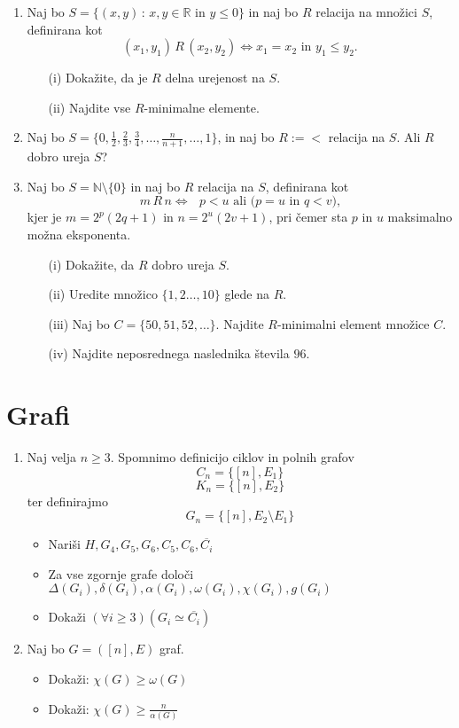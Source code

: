 \documentclass[11pt,paper=b5,footinclude,headinclude]{scrbook} %
\begin{document}
\begin{enumerate}
	\item Naj bo $S=\{ (x,y) \,:\, x, y\in\mathbb{R} \textrm{ in } y\leq 0 \}$ in naj bo $R$ relacija na množici $S$, definirana kot 
	$$(x_1,y_1)\, R\, (x_2,y_2) \Leftrightarrow  x_1 = x_2 \textrm{ in } y_1\leq y_2.$$
	\begin{enumerate}
		\item[(i)] Dokažite, da je $R$ delna urejenost na $S$.
		\item[(ii)] Najdite vse $R$-minimalne elemente.
	\end{enumerate}
	
	\item Naj bo $S= \{0,\frac{1}{2}, \frac{2}{3}, \frac{3}{4}, \ldots, \frac{n}{n+1}, \ldots, 1\}$, in naj bo $R:=<$ relacija na $S$. Ali $R$ dobro ureja $S$?
	
	\item Naj bo $S = \mathbb{N}\setminus \{0\}$ in naj bo  $R$ relacija na $S$, definirana kot 
	$$m\, R\, n \Leftrightarrow  \textrm{ $p< u$ ali ($p=u$ in $q < v$),} $$
	kjer je $m=2^p(2q+1)$ in $n=2^u(2v+1)$, pri čemer sta $p$ in $u$ maksimalno možna eksponenta.
	\begin{enumerate}
		\item[(i)] Dokažite, da $R$ dobro ureja $S$.
		\item[(ii)] Uredite množico $\{1,2\ldots, 10\}$ glede na $R$.
		\item[(iii)] Naj bo $C= \{50, 51, 52, \ldots\}$. Najdite $R$-minimalni element množice $C$.
		\item[(iv)] Najdite neposrednega naslednika števila $96$.
	\end{enumerate}
\end{enumerate}




\section{Grafi}
\begin{enumerate}
\item Naj velja $n\ge 3$. Spomnimo definicijo ciklov in polnih grafov
\[C_{n}=\{[n], E_{1}\}\]
\[K_{n}=\{[n], E_{2}\}\]
ter definirajmo 
\[G_{n}=\{[n], E_{2} \setminus E_{1}\}\]
\begin{itemize}
    \item Nariši \(H, G_{4}, G_{5}, G_{6}, C_{5}, C_{6}, \overline{C_{i}}\)
    \item Za  vse zgornje grafe določi \(\Delta(G_{i}), \delta(G_{i}), \alpha(G_{i}), \omega(G_{i}), \chi(G_{i}), g(G_{i})\)
    \item
Dokaži \((\forall i \geq 3) (G_{i} \simeq \overline{C_{i}})\)
\end{itemize}


\item
Naj bo \(G = ([n], E)\) graf.
\begin{itemize}
\item
Dokaži: \(\chi (G) \geq \omega (G)\)

\item
Dokaži: \(\chi (G) \geq \frac{n}{\alpha(G)}\)
\end{itemize}

\end{enumerate}
\end{document}
